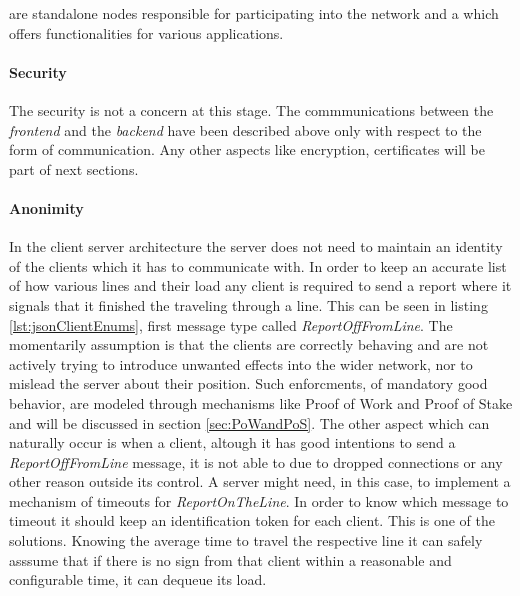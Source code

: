 \documentclass[a4paper,12pt,twoside]{book}
\begin{document}
are standalone nodes responsible for participating into the network and a  which offers  functionalities for various applications.

    \paragraph{Security} The security is not a concern at this stage. The commmunications between the \textit{frontend} and the \textit{backend} have been described above only with respect to the form of communication. Any other aspects like encryption, certificates will be part of next sections.

    \paragraph{Anonimity} In the client server architecture 
    \citep{MicroservicesCityTrafficSimulation} the server does not need to maintain an identity of the clients which it has to communicate with. In order to keep an accurate list of how various lines and their load any client is required to send a report where it signals that it finished the traveling through a line. This can be seen in listing \ref{lst:jsonClientEnums}, first message type called \textit{ReportOffFromLine}. The momentarily assumption is that the clients are correctly behaving and are not actively trying to introduce unwanted effects into the wider network, nor to mislead the server about their position. Such enforcments, of mandatory good behavior, are modeled through mechanisms like Proof of Work and Proof of Stake and will be discussed in section \ref{sec:PoWandPoS}. The other aspect which can naturally occur is when a client, altough it has good intentions to send a \textit{ReportOffFromLine} message, it is not able to due to dropped connections or any other reason outside its control. A server might need, in this case, to implement a mechanism of timeouts for \textit{ReportOnTheLine}. In order to know which message to timeout it should keep an identification token for each client. This is one of the solutions. Knowing the average time to travel the respective line it can safely asssume that if there is no sign from that client within a reasonable and configurable time, it can dequeue its load.
\end{document}
